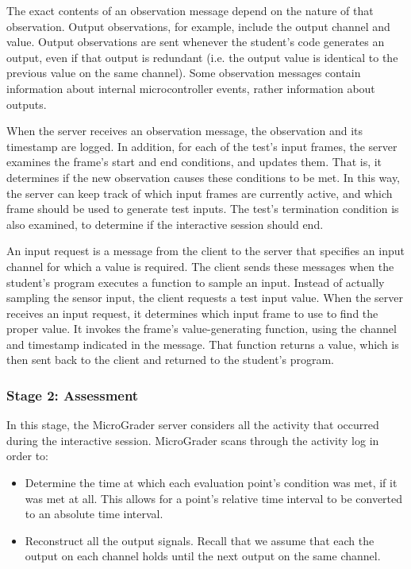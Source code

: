 \documentclass[12pt]{article}
\begin{document}
The exact contents of an observation message depend on the nature of that observation.  Output observations, for example, include the output channel and value.  Output observations are sent whenever the student's code generates an output, even if that output is redundant (i.e. the output value is identical to the previous value on the same channel).  Some observation messages contain information about internal microcontroller events, rather information about outputs.

When the server receives an observation message, the observation and its timestamp are logged.  In addition, for each of the test's input frames, the server examines the frame's start and end conditions, and updates them.  That is, it determines if the new observation causes these conditions to be met.  In this way, the server can keep track of which input frames are currently active, and which frame should be used to generate test inputs.  The test's termination condition is also examined, to determine if the interactive session should end.

An input request is a message from the client to the server that specifies an input channel for which a value is required.  The client sends these messages when the student's program executes a function to sample an input.  Instead of actually sampling the sensor input, the client requests a test input value.  When the server receives an input request, it determines which input frame to use to find the proper value.  It invokes the frame's value-generating function, using the channel and timestamp indicated in the message.  That function returns a value, which is then sent back to the client and returned to the student's program.

\subsubsection{Stage 2: Assessment}
In this stage, the MicroGrader server considers all the activity that occurred during the interactive session.  MicroGrader scans through the activity log in order to:

\begin{itemize}
\item Determine the time at which each evaluation point's condition was met, if it was met at all.  This allows for a point's relative time interval to be converted to an absolute time interval.
\item Reconstruct all the output signals.  Recall that we assume that each the output on each channel holds until the next output on the same channel.
\end{itemize}
\end{document}

